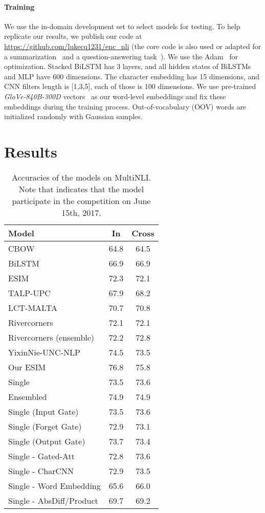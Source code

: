 \documentclass[11pt,letterpaper]{article}
\begin{document}
\paragraph{Training}
We use the in-domain development set to select models for testing. To help replicate our results, we publish our code at \url{https://github.com/lukecq1231/enc_nli} (the core code is also used or adapted for a summarization~\citep{DBLP:conf/ijcai/ChenZLWJ16} and a question-answering task~\citep{Zhang:qa:2017}). We use the Adam~\citep{DBLP:journals/corr/KingmaB14} for optimization. Stacked BiLSTM has 3 layers, and all hidden states of BiLSTMs and MLP have 600 dimensions. The character embedding has 15 dimensions, and CNN filters length is [1,3,5], each of those is 100 dimensions. We use pre-trained \textit{GloVe-840B-300D} vectors~\citep{Pennington:D14-1162} as our word-level embeddings and fix these embeddings during the training process. Out-of-vocabulary (OOV) words are initialized randomly with Gaussian samples. 

\section{Results}

\begin{table}[t!]
\renewcommand{\arraystretch}{0.9}
\centering
\begin{tabular}{|l|c|c|}
\hline
Model     & In & Cross\\
\hline
CBOW & 64.8 & 64.5 \\
BiLSTM &  66.9 & 66.9\\
ESIM & 72.3 & 72.1\\
\hline
TALP-UPC & 67.9 & 68.2 \\
LCT-MALTA& 70.7 & 70.8 \\
Rivercorners& 72.1 & 72.1\\
Rivercorners (ensemble)& 72.2 & 72.8 \\
YixinNie-UNC-NLP & 74.5 & 73.5 \\
\hline
Our ESIM & 76.8 & 75.8 \\
Single & 73.5 & 73.6 \\
Ensembled & 74.9 & 74.9 \\
\hline
Single (Input Gate) & 73.5 & 73.6 \\
Single (Forget Gate) & 72.9 & 73.1 \\
Single (Output Gate) & 73.7 & 73.4 \\
\hline
Single - Gated-Att & 72.8 & 73.6 \\
Single - CharCNN & 72.9 & 73.5 \\
Single - Word Embedding & 65.6 & 66.0 \\
Single - AbsDiff/Product & 69.7 & 69.2 \\
\hline
\end{tabular}
\caption{Accuracies of the models on MultiNLI. Note that  indicates that the model participate in the competition on June 15th, 2017.}
\label{tab:result}
\end{table}
\end{document}
